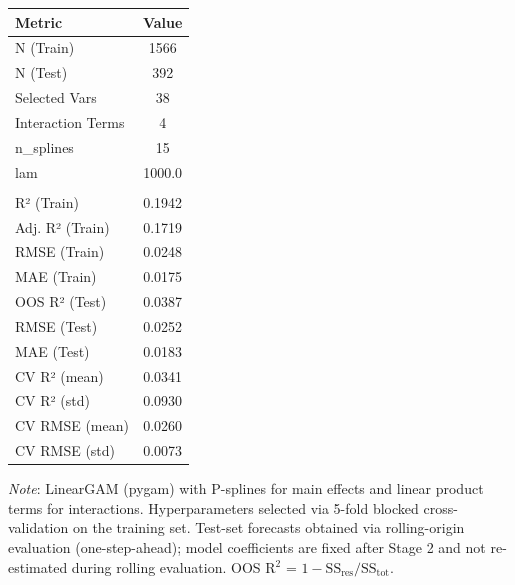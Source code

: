 \begin{tabular}{lc}
  \toprule
  \textbf{Metric} & \textbf{Value} \\ 
  \midrule
  N (Train) & 1566 \\ 
  N (Test) & 392 \\ 
  Selected Vars & 38 \\ 
  Interaction Terms & 4 \\ 
  n\_splines & 15 \\ 
  lam & 1000.0 \\ 
   &  \\ 
  R² (Train) & 0.1942 \\ 
  Adj. R² (Train) & 0.1719 \\ 
  RMSE (Train) & 0.0248 \\ 
  MAE (Train) & 0.0175 \\ 
  OOS R² (Test) & 0.0387 \\ 
  RMSE (Test) & 0.0252 \\ 
  MAE (Test) & 0.0183 \\ 
  CV R² (mean) & 0.0341 \\ 
  CV R² (std) & 0.0930 \\ 
  CV RMSE (mean) & 0.0260 \\ 
  CV RMSE (std) & 0.0073 \\ 
  \bottomrule
\end{tabular}
\par\vspace{4pt}
\begin{minipage}{\linewidth}
  \footnotesize \textit{Note}: LinearGAM (pygam) with P-splines for main effects and linear product terms for interactions. Hyperparameters selected via 5-fold blocked cross-validation on the training set. Test-set forecasts obtained via rolling-origin evaluation (one-step-ahead); model coefficients are fixed after Stage 2 and not re-estimated during rolling evaluation. OOS R$^2$ = $1 - \text{SS}_{\text{res}} / \text{SS}_{\text{tot}}$.
\end{minipage}